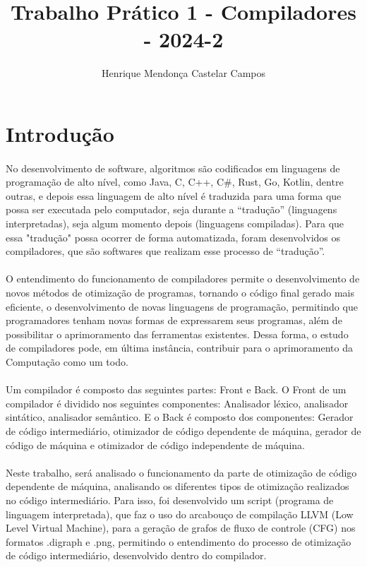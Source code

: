 \documentclass[12pt]{article}
\title{Trabalho Prático 1 - Compiladores - 2024-2}
\author{Henrique Mendonça Castelar Campos}
\begin{document}
\maketitle

\section{Introdução}

\paragraph{}No desenvolvimento de software, algoritmos são codificados em linguagens de programação de alto nível, como Java, C, C++, C\#, Rust, Go, Kotlin, dentre outras, e depois essa linguagem de alto nível é traduzida para uma forma que possa ser executada pelo computador, seja durante a “tradução” (linguagens interpretadas), seja algum momento depois (linguagens compiladas). Para que essa "tradução" possa ocorrer de forma automatizada, foram desenvolvidos os compiladores, que são softwares que realizam esse processo de “tradução”.

\paragraph{}O entendimento do funcionamento de compiladores permite o desenvolvimento de novos métodos de otimização de programas, tornando o código final gerado mais eficiente, o desenvolvimento de novas linguagens de programação, permitindo que programadores tenham novas formas de expressarem seus programas, além de possibilitar o aprimoramento das ferramentas existentes. Dessa forma, o estudo de compiladores pode, em última instância, contribuir para o aprimoramento da Computação como um todo.

\paragraph{}Um compilador é composto das seguintes partes: Front e Back. O Front de um compilador é dividido nos seguintes componentes: Analisador léxico, analisador sintático, analisador semântico. E o Back é composto dos componentes: Gerador de código intermediário, otimizador de código dependente de máquina, gerador de código de máquina e otimizador de código independente de máquina.

\paragraph{}Neste trabalho, será analisado o funcionamento da parte de otimização de código dependente de máquina, analisando os diferentes tipos de otimização realizados no código intermediário. Para isso, foi desenvolvido um script (programa de linguagem interpretada), que faz o uso do arcabouço de compilação LLVM (Low Level Virtual Machine), para a geração de grafos de fluxo de controle (CFG) nos formatos .digraph e .png, permitindo o entendimento do processo de otimização de código intermediário, desenvolvido dentro do compilador.
\end{document}
